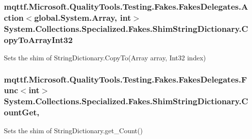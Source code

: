 \hypertarget{class_system_1_1_collections_1_1_specialized_1_1_fakes_1_1_shim_string_dictionary_ac74fdaa7a11437f629933fc8f75b8d4b}{
\subsubsection[{Copy\-To\-Array\-Int32}]{\setlength{\rightskip}{0pt plus 5cm}mqttf.\-Microsoft.\-Quality\-Tools.\-Testing.\-Fakes.\-Fakes\-Delegates.\-Action$<$global.\-System.\-Array, int$>$ System.\-Collections.\-Specialized.\-Fakes.\-Shim\-String\-Dictionary.\-Copy\-To\-Array\-Int32\hspace{0.3cm}{\ttfamily [set]}}}\label{class_system_1_1_collections_1_1_specialized_1_1_fakes_1_1_shim_string_dictionary_ac74fdaa7a11437f629933fc8f75b8d4b}


Sets the shim of String\-Dictionary.\-Copy\-To(\-Array array, Int32 index)

\hypertarget{class_system_1_1_collections_1_1_specialized_1_1_fakes_1_1_shim_string_dictionary_a0249897bd388c79be6fdd6a59f4ebd8e}{
\subsubsection[{Count\-Get}]{\setlength{\rightskip}{0pt plus 5cm}mqttf.\-Microsoft.\-Quality\-Tools.\-Testing.\-Fakes.\-Fakes\-Delegates.\-Func$<$int$>$ System.\-Collections.\-Specialized.\-Fakes.\-Shim\-String\-Dictionary.\-Count\-Get\hspace{0.3cm}{\ttfamily [get]}, {\ttfamily [set]}}}\label{class_system_1_1_collections_1_1_specialized_1_1_fakes_1_1_shim_string_dictionary_a0249897bd388c79be6fdd6a59f4ebd8e}


Sets the shim of String\-Dictionary.\-get\-\_\-\-Count()

